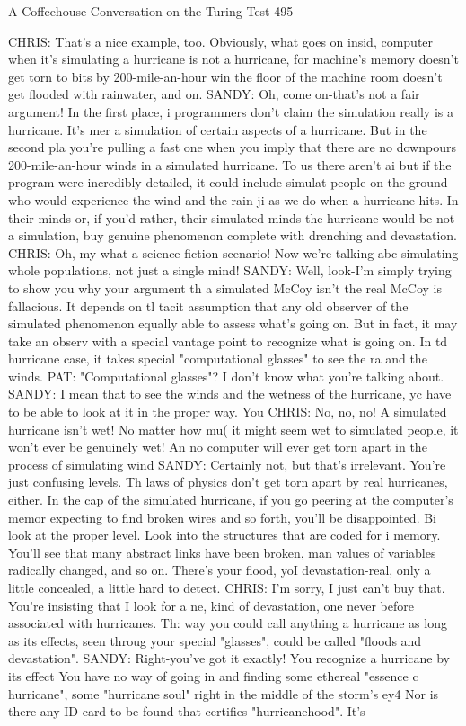 A Coffeehouse Conversation on the Turing Test                                        495

CHRIS: That's a nice example, too. Obviously, what goes on insid, computer when it's
   simulating a hurricane is not a hurricane, for machine's memory doesn't get torn
   to bits by 200-mile-an-hour win the floor of the machine room doesn't get
   flooded with rainwater, and on.
SANDY: Oh, come on-that's not a fair argument! In the first place, i programmers
   don't claim the simulation really is a hurricane. It's mer a simulation of certain
   aspects of a hurricane. But in the second pla you're pulling a fast one when you
   imply that there are no downpours 200-mile-an-hour winds in a simulated
   hurricane. To us there aren't ai but if the program were incredibly detailed, it
   could include simulat people on the ground who would experience the wind and
   the rain ji as we do when a hurricane hits. In their minds-or, if you'd rather, their
   simulated minds-the hurricane would be not a simulation, buy genuine
   phenomenon complete with drenching and devastation.
CHRIS: Oh, my-what a science-fiction scenario! Now we're talking abc simulating
   whole populations, not just a single mind!
SANDY: Well, look-I'm simply trying to show you why your argument th a simulated
   McCoy isn't the real McCoy is fallacious. It depends on tl tacit assumption that
   any old observer of the simulated phenomenon equally able to assess what's
   going on. But in fact, it may take an observ with a special vantage point to
   recognize what is going on. In td hurricane case, it takes special "computational
   glasses" to see the ra and the winds.
PAT: "Computational glasses"? I don't know what you're talking about.
SANDY: I mean that to see the winds and the wetness of the hurricane, yc have to be
   able to look at it in the proper way. You
CHRIS: No, no, no! A simulated hurricane isn't wet! No matter how mu( it might
   seem wet to simulated people, it won't ever be genuinely wet! An no computer
   will ever get torn apart in the process of simulating wind
SANDY: Certainly not, but that's irrelevant. You're just confusing levels. Th laws of
   physics don't get torn apart by real hurricanes, either. In the cap of the simulated
   hurricane, if you go peering at the computer's memor expecting to find broken
   wires and so forth, you'll be disappointed. Bi look at the proper level. Look into
   the structures that are coded for i memory. You'll see that many abstract links
   have been broken, man values of variables radically changed, and so on. There's
   your flood, yoI devastation-real, only a little concealed, a little hard to detect.
CHRIS: I'm sorry, I just can't buy that. You're insisting that I look for a ne, kind of
   devastation, one never before associated with hurricanes. Th: way you could call
   anything a hurricane as long as its effects, seen throug your special "glasses",
   could be called "floods and devastation".
SANDY: Right-you've got it exactly! You recognize a hurricane by its effect You
   have no way of going in and finding some ethereal "essence c hurricane", some
   "hurricane soul" right in the middle of the storm's ey4 Nor is there any ID card to
   be found that certifies "hurricanehood". It's




